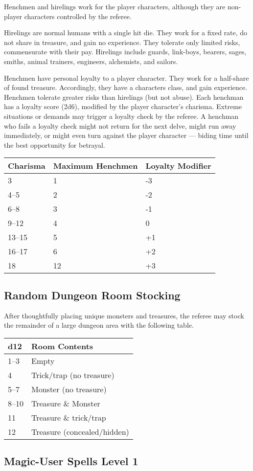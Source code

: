 Henchmen and hirelings work for the player characters, although they are
non-player characters controlled by the referee.

Hirelings are normal humans with a single hit die. They work for a fixed
rate, do not share in treasure, and gain no experience. They tolerate
only limited risks, commensurate with their pay. Hirelings include
guards, link-boys, bearers, sages, smiths, animal trainers, engineers,
alchemists, and sailors.

Henchmen have personal loyalty to a player character. They work for a
half-share of found treasure. Accordingly, they have a characters class,
and gain experience. Henchmen tolerate greater risks than hirelings (but
not abuse). Each henchman has a loyalty score (2d6), modified by the
player character's charisma. Extreme situations or demands may trigger a
loyalty check by the referee. A henchman who fails a loyalty check might
not return for the next delve, might run away immediately, or might even
turn against the player character --- biding time until the best
opportunity for betrayal.

\begin{longtable}[]{@{}lll@{}}
\toprule
Charisma & Maximum Henchmen & Loyalty Modifier\tabularnewline
\midrule
\endhead
3 & 1 & -3\tabularnewline
4--5 & 2 & -2\tabularnewline
6--8 & 3 & -1\tabularnewline
9--12 & 4 & 0\tabularnewline
13--15 & 5 & +1\tabularnewline
16--17 & 6 & +2\tabularnewline
18 & 12 & +3\tabularnewline
\bottomrule
\end{longtable}

\subsection{Random Dungeon Room
Stocking}\label{random-dungeon-room-stocking}

After thoughtfully placing unique monsters and treasures, the referee
may stock the remainder of a large dungeon area with the following
table.

\begin{longtable}[]{@{}ll@{}}
\toprule
d12 & Room Contents\tabularnewline
\midrule
\endhead
1--3 & Empty\tabularnewline
4 & Trick/trap (no treasure)\tabularnewline
5--7 & Monster (no treasure)\tabularnewline
8--10 & Treasure \& Monster\tabularnewline
11 & Treasure \& trick/trap\tabularnewline
12 & Treasure (concealed/hidden)\tabularnewline
\bottomrule
\end{longtable}

\subsection{Magic-User Spells Level 1}\label{magic-user-spells-level-1}

